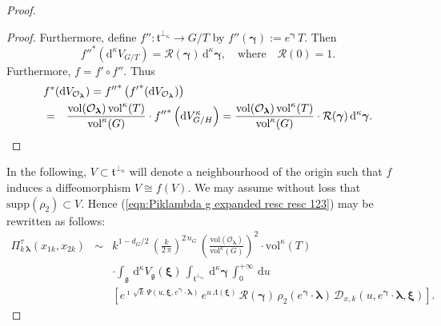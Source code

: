 \documentclass[12pt,a4paper]{article}
\theoremstyle{plain}
\theoremstyle{definition}
\begin{document}
\begin{proof}
\begin{proof}
Furthermore, 
define $f'':\mathfrak{t}^{\perp_\kappa}\rightarrow G/T$ by
$
f''(\boldsymbol{\gamma}):=e^{\boldsymbol{\gamma}}\,T
$.
Then
$$
{f''}^*(\mathrm{d}^\kappa V_{G/T})=\mathcal{R}(\boldsymbol{\gamma})\,
\mathrm{d}^\kappa\boldsymbol{\gamma}, \quad\text{where}\quad 
\mathcal{R}(0)=1.
$$
Furthermore, $f=f'\circ f''$. Thus
\begin{eqnarray*}
\lefteqn{
f^*(\mathrm{d}V_{\mathcal{O}_{\boldsymbol{\lambda}}})={f''}^*\left(
{f'}^*(\mathrm{d}V_{\mathcal{O}_{\boldsymbol{\lambda}}})\right)}\\
&=&
\frac{\mathrm{vol}(\mathcal{O}_{\boldsymbol{\lambda}})\,\mathrm{vol}^\kappa
(T)}{\mathrm{vol}^\kappa
(G)}\cdot 
{f''}^*\left(
%
\mathrm{d}V^\kappa _{G/H}\right)
=
\frac{\mathrm{vol}(\mathcal{O}_{\boldsymbol{\lambda}})\,\mathrm{vol}^\kappa
(T)}{\mathrm{vol}^\kappa
(G)}\cdot 
\mathcal{R}(\boldsymbol{\gamma})\,
\mathrm{d}^\kappa\boldsymbol{\gamma}
.
\end{eqnarray*}


\end{proof}

In the following, $V\subset \mathfrak{t}^{\perp_\kappa}$ will denote a neighbourhood of the origin such that $f$ induces a diffeomorphism
$V\cong f(V)$. We may assume without loss that 
$\mathrm{supp}(\rho_2)\subset V$. Hence (\ref{eqn:Piklambda g expanded resc resc 123}) may be rewritten as follows:
\begin{eqnarray}
\label{eqn:Piklambda g expanded resc resc 1234}
\Pi^\tau_{k\,\boldsymbol{\lambda}}(x_{1k},x_{2k})
&\sim&
%
k^{1-d_G/2}\,
\left(\frac{k}{2\,\pi}\right)^{2\,n_G}\,
\left(\frac{\mathrm{vol}(\mathcal{O}_{\boldsymbol{\lambda}})}{\mathrm{vol}^\kappa (G)}\right)^2\cdot 
\mathrm{vol}^\kappa
(T)
\\
&& \cdot 
\int_{\mathfrak{g}}\,
\mathrm{d}^\kappa V_{\mathfrak{g}}(\boldsymbol{\xi})\,\int_{\mathfrak{t}^{\perp_{\kappa_e}}}\,
%
\mathrm{d}^\kappa\boldsymbol{\gamma}\,\int_0^{+\infty}\,\mathrm{d}u
\nonumber\\
&&
\left[
 e^{\imath\,\sqrt{k}\,
\Psi
(u,\boldsymbol{\xi},e^{\boldsymbol{\gamma}}\cdot \boldsymbol{\lambda})
}\,e^{u\,\Lambda (\boldsymbol{\xi})}\,
\mathcal{R}(\boldsymbol{\gamma})\,
\rho_2(e^{\boldsymbol{\gamma}}\cdot \boldsymbol{\lambda})\,
\mathcal{D}_{x,k}\left(u,e^{\boldsymbol{\gamma}}\cdot \boldsymbol{\lambda},\boldsymbol{\xi}\right)\right].
\nonumber
\end{eqnarray}


\end{proof}
\end{document}
